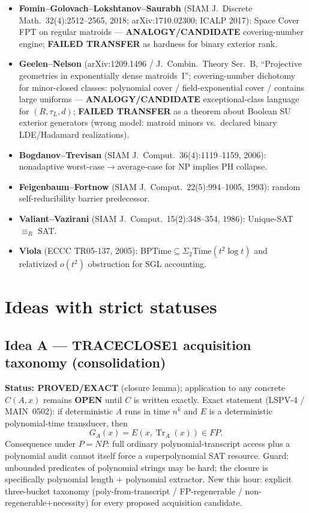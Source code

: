 \documentclass[11pt]{article}
\begin{document}
\begin{itemize}
SU/Hadamard windows.
\item \textbf{Fomin--Golovach--Lokshtanov--Saurabh} (SIAM J.\ Discrete Math.\ 32(4):2512--2565,
2018; arXiv:1710.02300; ICALP 2017): Space Cover FPT on regular matroids ---
\textbf{ANALOGY/CANDIDATE} covering-number engine; \textbf{FAILED TRANSFER} as hardness
for binary exterior rank.
\item \textbf{Geelen--Nelson} (arXiv:1209.1496 / J.\ Combin.\ Theory Ser.\ B, ``Projective
geometries in exponentially dense matroids~I''; covering-number dichotomy for
minor-closed classes: polynomial cover / field-exponential cover / contains large
uniforms --- \textbf{ANALOGY/CANDIDATE} exceptional-class language for $(R,\tau_L,d)$;
\textbf{FAILED TRANSFER} as a theorem about Boolean SU exterior generators (wrong model:
matroid minors vs.\ declared binary LDE/Hadamard realizations).
\item \textbf{Bogdanov--Trevisan} (SIAM J.\ Comput.\ 36(4):1119--1159, 2006): nonadaptive
worst-case$\to$average-case for NP implies PH collapse.
\item \textbf{Feigenbaum--Fortnow} (SIAM J.\ Comput.\ 22(5):994--1005, 1993): random
self-reducibility barrier predecessor.
\item \textbf{Valiant--Vazirani} (SIAM J.\ Comput.\ 15(2):348--354, 1986): Unique-SAT $\equiv_R$ SAT.
\item \textbf{Viola} (ECCC TR05-137, 2005): BPTime$\subseteq\Sigma_2$Time$(t^2\log t)$ and
relativized $o(t^2)$ obstruction for SGL accounting.
\end{itemize}

\section*{Ideas with strict statuses}
\subsection*{Idea A --- TRACECLOSE1 acquisition taxonomy (consolidation)}
\textbf{Status: PROVED/EXACT} (closure lemma); application to any concrete $C(A,x)$ remains
\textbf{OPEN} until $C$ is written exactly.
Exact statement (LSPV-4 / MAIN~0502): if deterministic $A$ runs in time $n^k$ and $E$ is a
deterministic polynomial-time transducer, then
\[
G_A(x)=E(x,\operatorname{Tr}_A(x))\in FP.
\]
Consequence under $P=NP$: full ordinary polynomial-transcript access plus a polynomial audit
cannot itself force a superpolynomial SAT resource. Guard: unbounded predicates of polynomial
strings may be hard; the closure is specifically polynomial length $+$ polynomial extractor.
New this hour: explicit three-bucket taxonomy (poly-from-transcript / FP-regenerable /
non-regenerable+necessity) for every proposed acquisition candidate.
\end{document}
